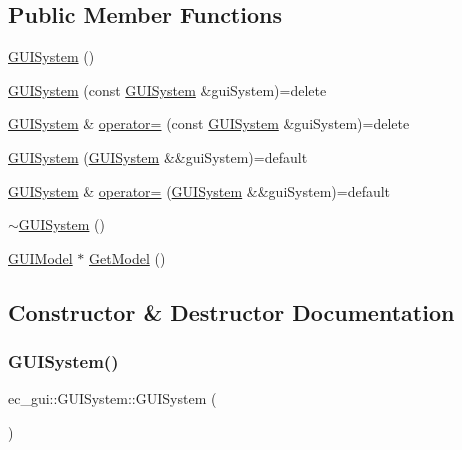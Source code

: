 \subsection*{Public Member Functions}
\begin{DoxyCompactItemize}
\item 
\mbox{\hyperlink{classec__gui_1_1_g_u_i_system_a142541f7f6fa72df67295af7b0cf7fe6}{G\+U\+I\+System}} ()
\item 
\mbox{\hyperlink{classec__gui_1_1_g_u_i_system_adc1c63958c41e5181657380d9b353938}{G\+U\+I\+System}} (const \mbox{\hyperlink{classec__gui_1_1_g_u_i_system}{G\+U\+I\+System}} \&gui\+System)=delete
\item 
\mbox{\hyperlink{classec__gui_1_1_g_u_i_system}{G\+U\+I\+System}} \& \mbox{\hyperlink{classec__gui_1_1_g_u_i_system_a7fd5c98407d1dccd0640c9fe26431166}{operator=}} (const \mbox{\hyperlink{classec__gui_1_1_g_u_i_system}{G\+U\+I\+System}} \&gui\+System)=delete
\item 
\mbox{\hyperlink{classec__gui_1_1_g_u_i_system_a76a1cb0abd551253a8e8bdd3c16f7d53}{G\+U\+I\+System}} (\mbox{\hyperlink{classec__gui_1_1_g_u_i_system}{G\+U\+I\+System}} \&\&gui\+System)=default
\item 
\mbox{\hyperlink{classec__gui_1_1_g_u_i_system}{G\+U\+I\+System}} \& \mbox{\hyperlink{classec__gui_1_1_g_u_i_system_aa9534e934526527c532b78f4c5a60f0c}{operator=}} (\mbox{\hyperlink{classec__gui_1_1_g_u_i_system}{G\+U\+I\+System}} \&\&gui\+System)=default
\item 
\mbox{\hyperlink{classec__gui_1_1_g_u_i_system_a4e74e2b54e0508930ecd8a5b98a8424c}{$\sim$\+G\+U\+I\+System}} ()
\item 
\mbox{\hyperlink{classec__gui_1_1_g_u_i_model}{G\+U\+I\+Model}} $\ast$ \mbox{\hyperlink{classec__gui_1_1_g_u_i_system_a1b1d6de0a467c72bc7a2dc3fcef72e95}{Get\+Model}} ()
\end{DoxyCompactItemize}


\subsection{Constructor \& Destructor Documentation}
\mbox{\label{classec__gui_1_1_g_u_i_system_a142541f7f6fa72df67295af7b0cf7fe6}} 
\subsubsection{\texorpdfstring{G\+U\+I\+System()}{GUISystem()}\hspace{0.1cm}{\footnotesize\ttfamily [1/3]}}
{\footnotesize\ttfamily ec\+\_\+gui\+::\+G\+U\+I\+System\+::\+G\+U\+I\+System (\begin{DoxyParamCaption}{ }\end{DoxyParamCaption})\hspace{0.3cm}{\ttfamily [explicit]}}

